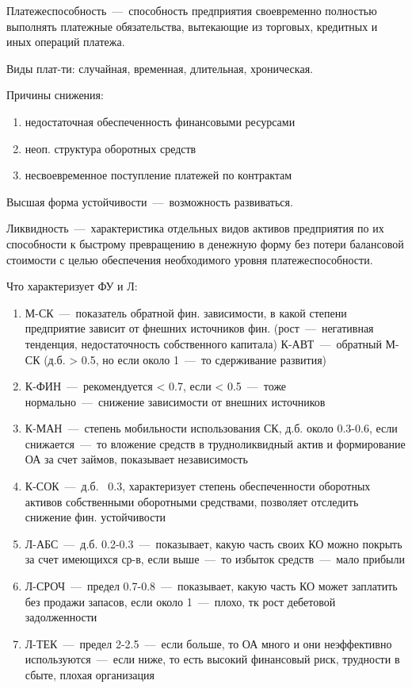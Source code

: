 \documentclass[14pt]{extarticle}
\begin{document}
Платежеспособность~---~способность предприятия своевременно полностью выполнять платежные обязательства, вытекающие из торговых, кредитных и иных операций платежа.

Виды плат-ти: случайная, временная, длительная, хроническая.

Причины снижения:

\begin{enumerate}
	\item недостаточная обеспеченность финансовыми ресурсами
	\item неоп. структура оборотных средств
	\item несвоевременное поступление платежей по контрактам
\end{enumerate}

Высшая форма устойчивости~---~возможность развиваться.

Ликвидность~---~характеристика отдельных видов активов предприятия по их способности к быстрому превращению в денежную форму без потери балансовой стоимости с целью обеспечения необходимого уровня платежеспособности.

Что характеризует ФУ и Л:

\begin{enumerate}
	\item М-СК~---~показатель обратной фин. зависимости, в какой степени предприятие зависит от фнешних источников фин. (рост~---~негативная тенденция, недостаточность собственного капитала) К-АВТ~---~обратный М-СК (д.б. > 0.5, но если около 1~---~то сдерживание развития)
	\item К-ФИН~---~рекомендуется < 0.7, если < 0.5~---~тоже нормально~---~снижение зависимости от внешних источников
	\item К-МАН~---~степень мобильности использования СК, д.б. около 0.3-0.6, если снижается~---~то вложение средств в трудноликвидный актив и формирование ОА за счет займов, показывает независимость
	\item К-СОК~---~д.б. ~0.3, характеризует степень обеспеченности оборотных активов собственными оборотными средствами, позволяет отследить снижение фин. устойчивости
	\item Л-АБС~---~д.б. 0.2-0.3~---~показывает, какую часть своих КО можно покрыть за счет имеющихся ср-в, если выше~---~то избыток средств~---~мало прибыли
	\item Л-СРОЧ~---~предел 0.7-0.8~---~показывает, какую часть КО может заплатить без продажи запасов, если около 1~---~плохо, тк рост дебетовой задолженности
	\item Л-ТЕК~---~предел 2-2.5~---~если больше, то ОА много и они неэффективно используются~---~если ниже, то есть высокий финансовый риск, трудности в сбыте, плохая организация
\end{enumerate}
\end{document}

